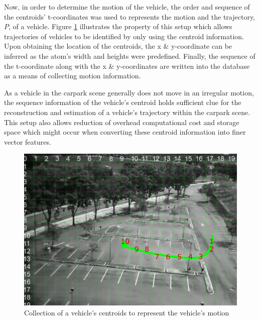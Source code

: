Now, in order to determine the motion of the vehicle, the order and sequence of the centroids' t-coordinates was used to represents the motion and the trajectory, $P$, of a vehicle. Figure \ref{fig:motionExample} illustrates the property of this setup which allows trajectories of vehicles to be identified by only using the centroid information. Upon obtaining the location of the centroids, the x \& y-coordinate can be inferred as the atom's width and heights were predefined. Finally, the sequence of the t-coordinate along with the x \& y-coordinates are written into the database as a means of collecting motion information.

As a vehicle in the carpark scene generally does not move in an irregular motion, the sequence information of the vehicle's centroid holds sufficient clue for the reconstruction and estimation of a vehicle's trajectory within the carpark scene. This setup also allows reduction of overhead computational cost and storage space which might occur when converting these centroid information into finer vector features. 


\begin{figure}[hbt!]\centering
\includegraphics[width=.9\textwidth]{image/general/trajectorysample.png}
\caption{Collection of a vehicle's centroids to represent the vehicle's motion}
\label{fig:motionExample}
\end{figure}
